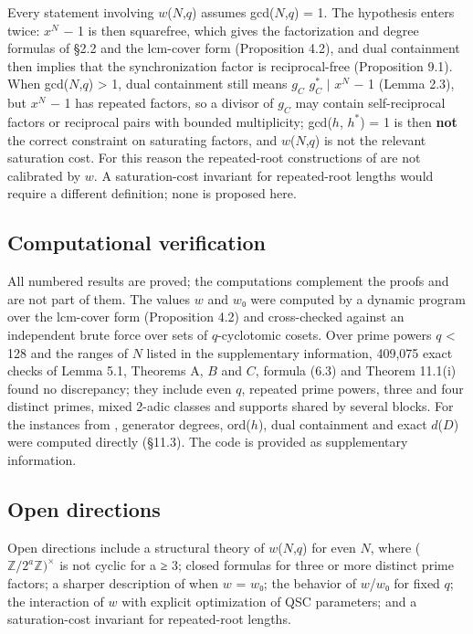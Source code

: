 \documentclass[pdflatex,sn-mathphys-num]{sn-jnl}
\theoremstyle{thmstyleone}
\theoremstyle{thmstylethree}
\begin{document}
Every statement involving \(w\)(\(N\),\(q\)) assumes gcd(\(N\),\(q\)) = 1. The hypothesis enters twice: \(x^N\) − 1 is then squarefree, which gives the factorization and degree formulas of §2.2 and the lcm-cover form (Proposition 4.2), and dual containment then implies that the synchronization factor is reciprocal-free (Proposition 9.1). When gcd(\(N\),\(q\)) \textgreater{} 1, dual containment still means \(g_C\) \(g_C^{*}\) \(\mid\) \(x^N\) − 1 (Lemma 2.3), but \(x^N\) − 1 has repeated factors, so a divisor of \(g_C\) may contain self-reciprocal factors or reciprocal pairs with bounded multiplicity; gcd(\(h\), \(h^{*}\)) = 1 is then \textbf{not} the correct constraint on saturating factors, and \(w\)(\(N\),\(q\)) is not the relevant saturation cost. For this reason the repeated-root constructions of \cite{DMLHW20} are not calibrated by \(w\). A saturation-cost invariant for repeated-root lengths would require a different definition; none is proposed here.

\subsection{Computational verification}

All numbered results are proved; the computations complement the proofs and are not part of them. The values \(w\) and \(w\)₀ were computed by a dynamic program over the lcm-cover form (Proposition 4.2) and cross-checked against an independent brute force over sets of \(q\)-cyclotomic cosets. Over prime powers \(q\) \textless{} 128 and the ranges of \(N\) listed in the supplementary information, 409,075 exact checks of Lemma 5.1, Theorems A, \(B\) and \(C\), formula (6.3) and Theorem 11.1(i) found no discrepancy; they include even \(q\), repeated prime powers, three and four distinct primes, mixed 2-adic classes and supports shared by several blocks. For the instances from \cite{LZ22}, generator degrees, ord(\(h\)), dual containment and exact \(d\)(\(D\)) were computed directly (§11.3). The code is provided as supplementary information.

\subsection{Open directions}

Open directions include a structural theory of \(w\)(\(N\),\(q\)) for even \(N\), where (\(ℤ/2^aℤ)^×\) is not cyclic for a ≥ 3; closed formulas for three or more distinct prime factors; a sharper description of when \(w\) = \(w\)₀; the behavior of \(w\)/\(w\)₀ for fixed \(q\); the interaction of \(w\) with explicit optimization of QSC parameters; and a saturation-cost invariant for repeated-root lengths.
\end{document}
